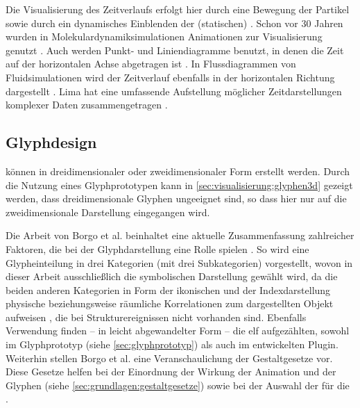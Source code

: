 Die Visualisierung des Zeitverlaufs erfolgt hier durch eine Bewegung der Partikel sowie durch ein dynamisches Einblenden der (statischen) . Schon vor 30 Jahren wurden in Molekulardynamiksimulationen Animationen zur Visualisierung genutzt \cite{delhaise1984computerAnimation}. Auch werden Punkt- und Liniendiagramme benutzt, in denen die Zeit auf der horizontalen Achse abgetragen ist \cite{nerukh2008temporalPatternsMD}. In Flussdiagrammen von Fluidsimulationen wird der Zeitverlauf ebenfalls in der horizontalen Richtung dargestellt \cite{laney2006turbulentMixingLayer}. Lima hat eine umfassende Aufstellung möglicher Zeitdarstellungen komplexer Daten zusammengetragen \cite{lima2013visualComplexity}.


\subsection*{Glyphdesign}\label{sec:related:glyphdesign}

 können in dreidimensionaler oder zweidimensionaler Form erstellt werden. Durch die Nutzung eines Glyphprototypen kann in \autoref{sec:visualisierung:glyphen3d} gezeigt werden, dass dreidimensionale Glyphen ungeeignet sind, so dass hier nur auf die zweidimensionale Darstellung eingegangen wird.

Die Arbeit von Borgo et al. beinhaltet eine aktuelle Zusammenfassung zahlreicher Faktoren, die bei der Glyphdarstellung eine Rolle spielen \cite{borgo2013glyph}. So wird eine Glypheinteilung in drei Kategorien (mit drei Subkategorien) vorgestellt, wovon in dieser Arbeit ausschließlich die symbolischen Darstellung gewählt wird, da die beiden anderen Kategorien in Form der ikonischen und der Indexdarstellung physische beziehungsweise räumliche Korrelationen zum dargestellten Objekt aufweisen \cite[S.~3]{borgo2013glyph}, die bei Strukturereignissen nicht vorhanden sind. Ebenfalls Verwendung finden -- in leicht abgewandelter Form -- die elf aufgezählten,  sowohl im Glyphprototyp (siehe \autoref{sec:glyphprototyp}) als auch im entwickelten Plugin. Weiterhin stellen Borgo et al. eine Veranschaulichung der Gestaltgesetze vor. Diese Gesetze helfen bei der Einordnung der Wirkung der Animation und der Glyphen (siehe \autoref{sec:grundlagen:gestaltgesetze}) sowie bei der Auswahl der  für die .

